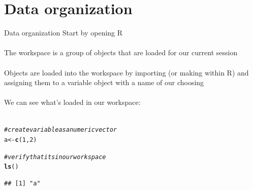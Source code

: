 \documentclass[xcolor=svgnames]{beamer}\usepackage[]{graphicx}\usepackage[]{color}
\makeatletter
\newcommand{\hlnum}[1]{\textcolor[rgb]{0.686,0.059,0.569}{#1}}%
\newcommand{\hlcom}[1]{\textcolor[rgb]{0.678,0.584,0.686}{\textit{#1}}}%
\newcommand{\hlstd}[1]{\textcolor[rgb]{0.345,0.345,0.345}{#1}}%
\newcommand{\hlkwb}[1]{\textcolor[rgb]{0.69,0.353,0.396}{#1}}%
\newcommand{\hlkwd}[1]{\textcolor[rgb]{0.737,0.353,0.396}{\textbf{#1}}}%
\newenvironment{kframe}{%
 \def\at@end@of@kframe{}%
 \ifinner\ifhmode%
  \def\at@end@of@kframe{\end{minipage}}%
  \begin{minipage}{\columnwidth}%
 \fi\fi%
 \def\FrameCommand##1{\hskip\@totalleftmargin \hskip-\fboxsep
 \colorbox{shadecolor}{##1}\hskip-\fboxsep
     \hskip-\linewidth \hskip-\@totalleftmargin \hskip\columnwidth}%
 \MakeFramed {\advance\hsize-\width
   \@totalleftmargin\z@ \linewidth\hsize
   \@setminipage}}%
 {\par\unskip\endMakeFramed%
 \at@end@of@kframe}
\newenvironment{knitrout}{}{} %
\makeatother
\begin{document}
\section{Data organization}

\begin{frame}[fragile]{Data organization}
Start by opening R \\~\\
The workspace is a group of objects that are loaded for our current session \\~\\
Objects are loaded into the workspace by importing (or making within R) and assigning them to a variable object with a name of our choosing\\~\\
We can see what's loaded in our workspace:\\~\\
\begin{knitrout}\scriptsize
{}\color{fgcolor}\begin{kframe}
\begin{alltt}
\hlcom{# create variable as a numeric vector}
\hlstd{a} \hlkwb{<-} \hlkwd{c}\hlstd{(}\hlnum{1}\hlstd{,} \hlnum{2}\hlstd{)}

\hlcom{# verify that its in our workspace}
\hlkwd{ls}\hlstd{()}
\end{alltt}
\begin{verbatim}
## [1] "a"
\end{verbatim}
\end{kframe}
\end{knitrout}
\end{frame}
\end{document}

